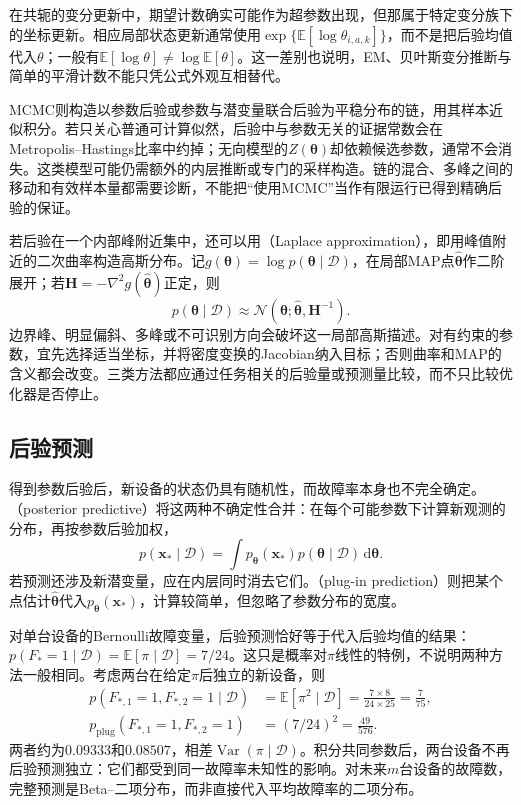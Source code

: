 在共轭的变分更新中，期望计数确实可能作为超参数出现，但那属于特定变分族下的坐标更新。相应局部状态更新通常使用$\exp\{\mathbb{E}[\log\theta_{i,a,k}]\}$，而不是把后验均值代入$\theta$；一般有$\mathbb{E}[\log\theta]\ne\log\mathbb{E}[\theta]$。这一差别也说明，EM、贝叶斯变分推断与简单的平滑计数不能只凭公式外观互相替代。

MCMC则构造以参数后验或参数与潜变量联合后验为平稳分布的链，用其样本近似积分。若只关心普通可计算似然，后验中与参数无关的证据常数会在Metropolis--Hastings比率中约掉；无向模型的$Z(\bm{\theta})$却依赖候选参数，通常不会消失。这类模型可能仍需额外的内层推断或专门的采样构造。链的混合、多峰之间的移动和有效样本量都需要诊断，不能把“使用MCMC”当作有限运行已得到精确后验的保证。

若后验在一个内部峰附近集中，还可以用（Laplace approximation），即用峰值附近的二次曲率构造高斯分布。记$g(\bm{\theta})=\log p(\bm{\theta}\mid\mathcal{D})$，在局部MAP点$\widehat{\bm{\theta}}$作二阶展开；若$\bm{H}=-\nabla^2g(\widehat{\bm{\theta}})$正定，则
\[
  p(\bm{\theta}\mid\mathcal{D})
    \approx\mathcal{N}(\bm{\theta};
          \widehat{\bm{\theta}},\bm{H}^{-1}).
\]
边界峰、明显偏斜、多峰或不可识别方向会破坏这一局部高斯描述。对有约束的参数，宜先选择适当坐标，并将密度变换的Jacobian纳入目标；否则曲率和MAP的含义都会改变。三类方法都应通过任务相关的后验量或预测量比较，而不只比较优化器是否停止。

\subsection{后验预测}
\label{sec:pgm-parameter-learning-posterior-predictive}

得到参数后验后，新设备的状态仍具有随机性，而故障率本身也不完全确定。（posterior predictive）将这两种不确定性合并：在每个可能参数下计算新观测的分布，再按参数后验加权，
\begin{equation}
  p(\bm{x}_*\mid\mathcal{D})
   =\int p_{\bm{\theta}}(\bm{x}_*)
            p(\bm{\theta}\mid\mathcal{D})\,\mathrm{d}\bm{\theta}.
  \label{eq:pgm-parameter-learning-posterior-predictive}
\end{equation}
若预测还涉及新潜变量，应在内层同时消去它们。（plug-in prediction）则把某个点估计$\widehat{\bm{\theta}}$代入$p_{\bm{\theta}}(\bm{x}_*)$，计算较简单，但忽略了参数分布的宽度。

对单台设备的Bernoulli故障变量，后验预测恰好等于代入后验均值的结果：$p(F_*=1\mid\mathcal{D})=\mathbb{E}[\pi\mid\mathcal{D}]=7/24$。这只是概率对$\pi$线性的特例，不说明两种方法一般相同。考虑两台在给定$\pi$后独立的新设备，则
\[
  \begin{aligned}
    p(F_{*,1}=1,F_{*,2}=1\mid\mathcal{D})
      &=\mathbb{E}[\pi^2\mid\mathcal{D}]
        =\frac{7\times8}{24\times25}
        =\frac{7}{75},\\
    p_{\mathrm{plug}}(F_{*,1}=1,F_{*,2}=1)
      &=(7/24)^2=\frac{49}{576}.
  \end{aligned}
\]
两者约为$0.09333$和$0.08507$，相差$\operatorname{Var}(\pi\mid\mathcal{D})$。积分共同参数后，两台设备不再后验预测独立：它们都受到同一故障率未知性的影响。对未来$m$台设备的故障数，完整预测是Beta--二项分布，而非直接代入平均故障率的二项分布。

